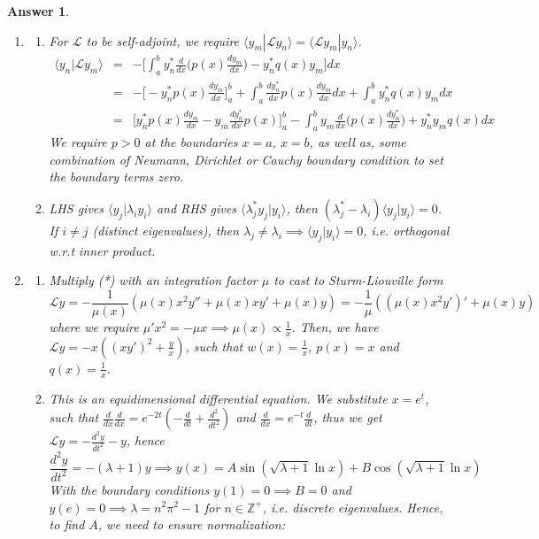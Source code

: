 \documentclass[a4paper]{article}
\newtheorem{ans}{Answer}[section]
\theoremstyle{new}
\begin{document}
\begin{ans}\leavevmode
\begin{enumerate}[label=(\roman*)]
\item \begin{enumerate}[label=(\alph*)]
\item For $\mathcal{L}$ to be self-adjoint, we require $\langle y_m|\mathcal{L}y_n\rangle=\langle\mathcal{L}y_m|y_n\rangle$.
\begin{eqnarray}
\langle y_n|\mathcal{L}y_m\rangle&=&-\bigg[\int_a^b y_n^*\frac{d}{dx}\bigg(p(x)\frac{dy_m}{dx}\bigg)-y_n^*q(x)y_m\bigg]dx\nonumber\\&=&-\bigg[-y_n^*p(x)\frac{dy_m}{dx}\bigg]_a^b+\int_a^b \frac{dy_n^*}{dx}p(x)\frac{dy_m}{dx}dx+\int_a^by_n^*q(x)y_mdx\nonumber\\&=&\bigg[y_n^*p(x)\frac{dy_m}{dx}-y_m\frac{dy_n^*}{dx}p(x)\bigg]_a^b-\int_a^b y_m\frac{d}{dx}\bigg(p(x)\frac{dy_n^*}{dx}\bigg)+y_n^*y_mq(x)dx\nonumber
\end{eqnarray}
We require $p>0$ at the boundaries $x=a$, $x=b$, as well as, some combination of Neumann, Dirichlet or Cauchy boundary condition to set the boundary terms zero. 
\item LHS gives $\langle y_j|\lambda_iy_i\rangle$ and RHS gives $\langle\lambda_j^*y_j|y_i\rangle$, then $(\lambda_j^*-\lambda_i)\langle y_j|y_i\rangle=0$. If $i\neq j$ (distinct eigenvalues), then $\lambda_j\neq\lambda_i\implies\langle y_j|y_i\rangle=0$, i.e. orthogonal w.r.t inner product.
\end{enumerate}
\item
\begin{enumerate}[label=(\alph*)]
\item Multiply (*) with an integration factor $\mu$ to cast to Sturm-Liouville form
$$\mathcal{L}y=-\frac{1}{\mu(x)}(\mu(x) x^2y''+\mu(x) xy'+\mu(x)y)=-\frac{1}{\mu}((\mu(x)x^2y')'+\mu(x)y)$$
where we require $\mu'x^2=-\mu x\implies\mu(x)\propto\frac{1}{x}$. Then, we have $\mathcal{L}y=-x((xy')^2+\frac{y}{x})$, such that $w(x)=\frac{1}{x}$, $p(x)=x$ and $q(x)=\frac{1}{x}$.
\item This is an equidimensional differential equation. We substitute $x=e^t$, such that $\frac{d}{dx}\frac{d}{dx}=e^{-2t}(-\frac{d}{dt}+\frac{d^2}{dt^2})$ and $\frac{d}{dx}=e^{-t}\frac{d}{dt}$, thus we get $\mathcal{L}y=-\frac{d^2y}{dt^2}-y$, hence 
$$\frac{d^2y}{dt^2}=-(\lambda+1)y\implies y(x)=A\sin(\sqrt{\lambda+1}\ln x)+B\cos(\sqrt{\lambda+1}\ln x)$$
With the boundary conditions $y(1)=0\implies B=0$ and $y(e)=0\implies\lambda=n^2\pi^2-1$ for $n\in\mathbb{Z}^+$, i.e. discrete eigenvalues. Hence, to find $A$, we need to ensure normalization:

\end{enumerate}
\end{enumerate}
\end{ans}
\end{document}
